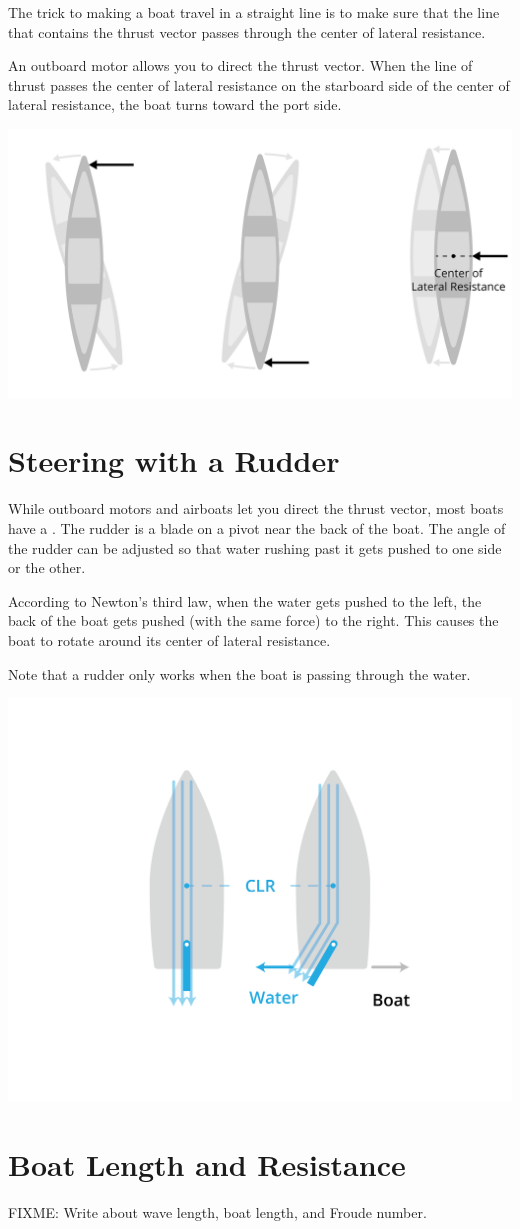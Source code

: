 The trick to making a boat travel in a straight line is to make sure that the line that contains the thrust vector passes through the center of lateral resistance.

An outboard motor allows you to direct the thrust vector. When the line of thrust passes the center of lateral resistance on the starboard side of the center of lateral resistance, the boat turns toward the port side.

\begin{center}
    \includegraphics[width=.75\textwidth]{lateralResistance.png}

\end{center}

\section{Steering with a Rudder}
While outboard motors and airboats let you direct the thrust vector,  most boats have a .  The rudder is a blade on a pivot near the back of
the boat. The angle of the rudder can be adjusted so that water rushing past it gets pushed to one side or the other.

According to Newton's third law,  when the water gets pushed to the left,  the back of the boat gets pushed (with the same force) to the right.  This causes the boat to rotate around its center of lateral resistance.

Note that a rudder only works when the boat is passing through the water.

\begin{center}
    \includegraphics[width=.75\textwidth]{rudder.png}

\end{center}

\section{Boat Length and Resistance}

FIXME: Write about wave length,  boat length, and Froude number.
